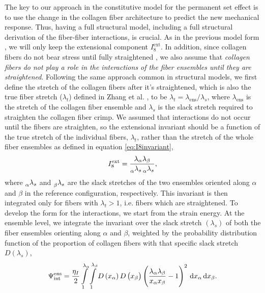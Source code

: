     The key to our approach in the constitutive model for the permanent set effect is to use the change in the collagen fiber architecture to predict the new mechanical response. Thus, having a full structural model, including a full structural derivation of the fiber-fiber interactions, is crucial. As in the previous model form \cite{sacks_novel_2015}, we will only keep the extensional component $I_8^\mathrm{ext}$. In addition, since collagen fibers do not bear stress until fully straightened \cite{soares_biomechanical_2016}, we also assume that \emph{collagen fibers do not play a role in the interactions of the fiber ensembles until they are straightened}. Following the same approach common in structural models, we first define the stretch of the collagen fibers after it's straightened, which is also the true fiber stretch ($\lambda_t$) defined in Zhang et al. \cite{zhang_meso_2016}, to be $\lambda_t = \lambda_\mathrm{ens}/\lambda_s$, where $\lambda_\mathrm{ens}$ is the stretch of the collagen fiber ensemble and $\lambda_s$ is the slack stretch required to straighten the collagen fiber crimp. We assumed that interactions do not occur until the fibers are straighten, so the extensional invariant should be a function of the true stretch of the individual fibers, $\lambda_t$, rather than the stretch of the whole fiber ensembles as defined in equation \ref{eq:I8invariant},
\begin{equation}
I_8^{\mathrm{ext}} = \frac{\lambda_\alpha \lambda_\beta}{\prescript{}{\alpha}{\lambda}_s \prescript{}{\alpha}{\lambda}_s},
\end{equation}
    where $\prescript{}{\alpha}{\lambda}_s$ and $\prescript{}{\beta}{\lambda}_s$ are the slack stretches of the two ensembles oriented along $\alpha$ and $\beta$ in the reference configuration, respectively. This invariant is then integrated only for fibers with $\lambda_t > 1$, i.e. fibers which are straightened. To develop the form for the interactions, we start from the strain energy. At the ensemble level, we integrate the invariant over the slack stretch $(\lambda_s)$ of both the fiber ensembles orienting along $\alpha$ and $\beta$, weighted by the probability distribution function of the proportion of collagen fibers with that specific slack stretch $D(\lambda_s)$,
\begin{equation}
\Psi_{\mathrm{int}}^{\mathrm{ens}} = \frac{\eta_I}{2} \int\displaylimits_1^{\lambda_\alpha} \int\displaylimits_1^{\lambda_\beta} D\left( x_\alpha \right) D\left( x_\beta \right) \left( \frac{\lambda_\alpha \lambda_\beta}{x_\alpha x_\beta} - 1\right)^2 \,\mathrm{d}x_\alpha \,\mathrm{d}x_\beta.
\end{equation}
